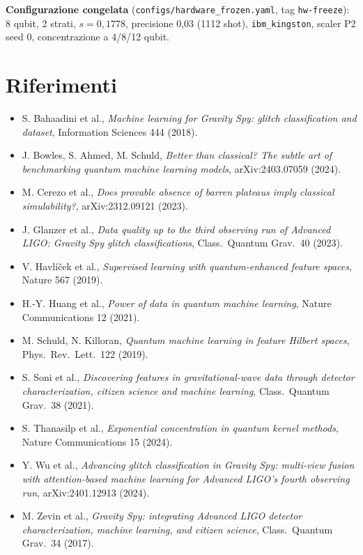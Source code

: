 \textbf{Configurazione congelata} (\texttt{configs/hardware\_frozen.yaml}, tag \texttt{hw-freeze}): 8 qubit, 2 strati,
$s=0{,}1778$, precisione 0,03 (1112 shot), \texttt{ibm\_kingston}, scaler P2 seed 0, concentrazione a 4/8/12 qubit.


\section{Riferimenti}
\begin{itemize}
  \item S. Bahaadini et al., \emph{Machine learning for Gravity Spy: glitch classification and dataset}, Information
  Sciences 444 (2018).
  \item J. Bowles, S. Ahmed, M. Schuld, \emph{Better than classical? The subtle art of benchmarking quantum machine
  learning models}, arXiv:2403.07059 (2024).
  \item M. Cerezo et al., \emph{Does provable absence of barren plateaus imply classical simulability?},
  arXiv:2312.09121 (2023).
  \item J. Glanzer et al., \emph{Data quality up to the third observing run of Advanced LIGO: Gravity Spy glitch
  classifications}, Class.\ Quantum Grav.\ 40 (2023).
  \item V. Havlíček et al., \emph{Supervised learning with quantum-enhanced feature spaces}, Nature 567 (2019).
  \item H.-Y. Huang et al., \emph{Power of data in quantum machine learning}, Nature Communications 12 (2021).
  \item M. Schuld, N. Killoran, \emph{Quantum machine learning in feature Hilbert spaces}, Phys.\ Rev.\ Lett.\ 122 (2019).
  \item S. Soni et al., \emph{Discovering features in gravitational-wave data through detector characterization,
  citizen science and machine learning}, Class.\ Quantum Grav.\ 38 (2021).
  \item S. Thanasilp et al., \emph{Exponential concentration in quantum kernel methods}, Nature Communications 15 (2024).
  \item Y. Wu et al., \emph{Advancing glitch classification in Gravity Spy: multi-view fusion with attention-based machine
  learning for Advanced LIGO’s fourth observing run}, arXiv:2401.12913 (2024).
  \item M. Zevin et al., \emph{Gravity Spy: integrating Advanced LIGO detector characterization, machine learning, and
  citizen science}, Class.\ Quantum Grav.\ 34 (2017).
\end{itemize}

